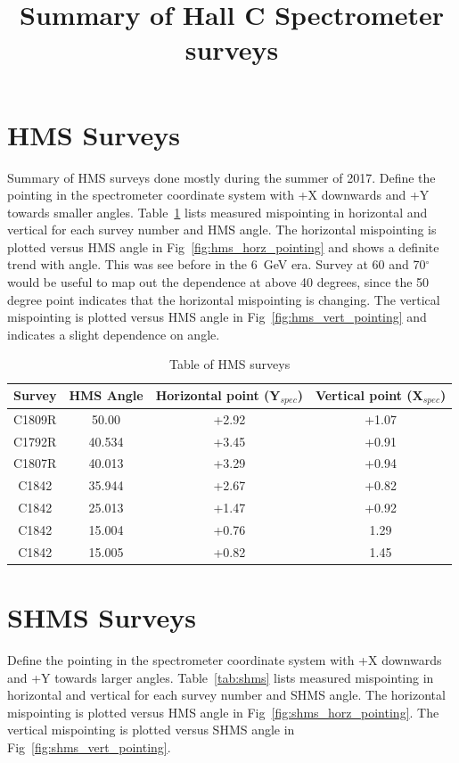 \documentclass[]{article}
\title{Summary of Hall C Spectrometer surveys}
\begin{document}
\section{HMS Surveys}
	Summary of HMS surveys done mostly during the summer of 2017. Define the pointing in the spectrometer coordinate system with +X downwards and +Y towards smaller angles.
		Table~\ref{tab:hms} lists measured mispointing in horizontal and vertical for each survey number and HMS angle. The horizontal mispointing is plotted versus HMS angle in Fig~\ref{fig:hms_horz_pointing} and shows a definite trend with angle. This was see before in the 6~GeV era. Survey at 60 and 70$^{\circ}$ would be useful to map out the dependence at above 40 degrees, since the 50 degree point indicates that the horizontal mispointing is changing. The vertical mispointing is plotted versus
		HMS angle in Fig~\ref{fig:hms_vert_pointing} and indicates a slight dependence on
		angle.
	
	\begin{table}[h]
	\begin{center}
	\begin{tabular}[]{|c|c||c|c|} \hline\hline
		Survey & HMS Angle  & Horizontal point (Y$_{spec}$) & Vertical point (X$_{spec}$)\\ \hline
		C1809R & 50.00  & +2.92 & +1.07 \\ \hline
		C1792R & 40.534 & +3.45& +0.91\\ \hline
		C1807R & 40.013 & +3.29 & +0.94 \\ \hline
		C1842 & 35.944 & +2.67 & +0.82\\ \hline
		C1842  & 25.013 & +1.47 &  +0.92 \\ \hline
		C1842  & 15.004 & +0.76 & 1.29\\ \hline
			C1842  & 15.005 & +0.82 & 1.45 \\ \hline
	\end{tabular}
	\caption{Table of HMS surveys}
	\label{tab:hms}
				\end{center}
	\end{table}


\section{SHMS Surveys}
Define the pointing in the spectrometer coordinate system with +X downwards and +Y towards larger angles.
Table~\ref{tab:shms} lists measured mispointing in horizontal and vertical for each survey number and SHMS angle. The horizontal mispointing is plotted versus HMS angle in Fig~\ref{fig:shms_horz_pointing}.  The vertical mispointing is plotted versus
SHMS angle in Fig~\ref{fig:shms_vert_pointing}. 
			
\end{document}
